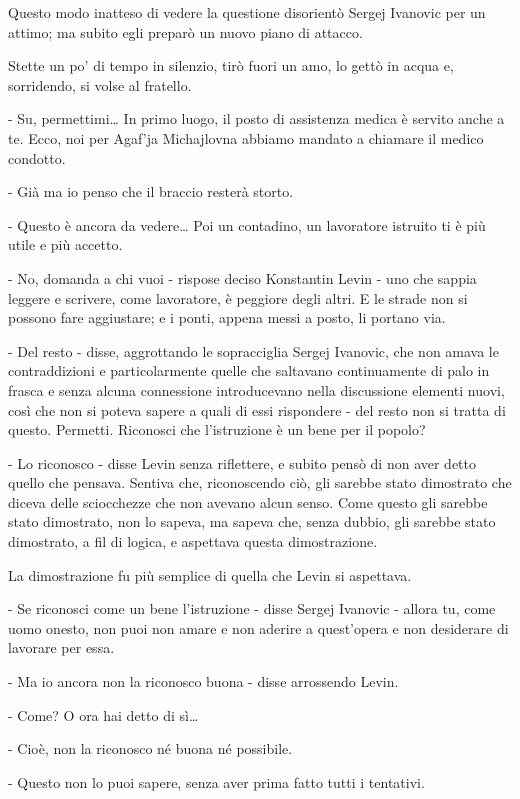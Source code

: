 Questo modo inatteso di vedere la questione disorientò Sergej Ivanovic per un attimo; ma subito egli preparò un nuovo piano di attacco. 

Stette un po' di tempo in silenzio, tirò fuori un amo, lo gettò in acqua e, sorridendo, si volse al fratello. 

- Su, permettimi\ldots{} In primo luogo, il posto di assistenza medica è servito anche a te. Ecco, noi per Agaf'ja Michajlovna abbiamo mandato a chiamare il medico condotto. 

- Già ma io penso che il braccio resterà storto. 

- Questo è ancora da vedere\ldots{} Poi un contadino, un lavoratore istruito ti è più utile e più accetto. 

- No, domanda a chi vuoi - rispose deciso Konstantin Levin - uno che sappia leggere e scrivere, come lavoratore, è peggiore degli altri. E le strade non si possono fare aggiustare; e i ponti, appena messi a posto, li portano via. 

- Del resto - disse, aggrottando le sopracciglia Sergej Ivanovic, che non amava le contraddizioni e particolarmente quelle che saltavano continuamente di palo in frasca e senza alcuna connessione introducevano nella discussione elementi nuovi, così che non si poteva sapere a quali di essi rispondere - del resto non si tratta di questo. Permetti. Riconosci che l'istruzione è un bene per il popolo? 

- Lo riconosco - disse Levin senza riflettere, e subito pensò di non aver detto quello che pensava. Sentiva che, riconoscendo ciò, gli sarebbe stato dimostrato che diceva delle sciocchezze che non avevano alcun senso. Come questo gli sarebbe stato dimostrato, non lo sapeva, ma sapeva che, senza dubbio, gli sarebbe stato dimostrato, a fil di logica, e aspettava questa dimostrazione. 

La dimostrazione fu più semplice di quella che Levin si aspettava. 

- Se riconosci come un bene l'istruzione - disse Sergej Ivanovic - allora tu, come uomo onesto, non puoi non amare e non aderire a quest'opera e non desiderare di lavorare per essa. 

- Ma io ancora non la riconosco buona - disse arrossendo Levin. 

- Come? O ora hai detto di sì\ldots{} 

- Cioè, non la riconosco né buona né possibile. 

- Questo non lo puoi sapere, senza aver prima fatto tutti i tentativi. 

